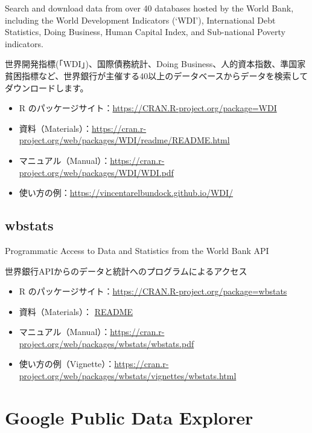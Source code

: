 \documentclass[
  xelatex, ja=standard]{bxjsbook}
\theoremstyle{definition}
\theoremstyle{definition}
\theoremstyle{definition}
\theoremstyle{definition}
\theoremstyle{remark}
\begin{document}
Search and download data from over 40 databases hosted by the World Bank, including the World Development Indicators (`WDI'), International Debt Statistics, Doing Business, Human Capital Index, and Sub-national Poverty indicators.

世界開発指標(「WDI」)、国際債務統計、Doing Business、人的資本指数、準国家貧困指標など、世界銀行が主催する40以上のデータベースからデータを検索してダウンロードします。

\begin{itemize}
\item
  R のパッケージサイト：\href{https://cran.r-project.org/package=WDI}{https://CRAN.R-project.org/package=WDI}
\item
  資料（Materials）：\url{https://cran.r-project.org/web/packages/WDI/readme/README.html}
\item
  マニュアル（Manual）：\url{https://cran.r-project.org/web/packages/WDI/WDI.pdf}
\item
  使い方の例：\url{https://vincentarelbundock.github.io/WDI/}
\end{itemize}

\hypertarget{wbstats}{%
\subsection{wbstats}\label{wbstats}}

Programmatic Access to Data and Statistics from the World Bank API

世界銀行APIからのデータと統計へのプログラムによるアクセス

\begin{itemize}
\item
  R のパッケージサイト：\href{https://cran.r-project.org/package=wbstats}{https://CRAN.R-project.org/package=wbstats}
\item
  資料（Materials）： \href{https://cran.r-project.org/web/packages/wbstats/readme/README.html}{README}
\item
  マニュアル（Manual）：\url{https://cran.r-project.org/web/packages/wbstats/wbstats.pdf}
\item
  使い方の例（Vignette）：\url{https://cran.r-project.org/web/packages/wbstats/vignettes/wbstats.html}
\end{itemize}

\hypertarget{google-public-data-explorer}{%
\section{Google Public Data Explorer}\label{google-public-data-explorer}}
\end{document}
